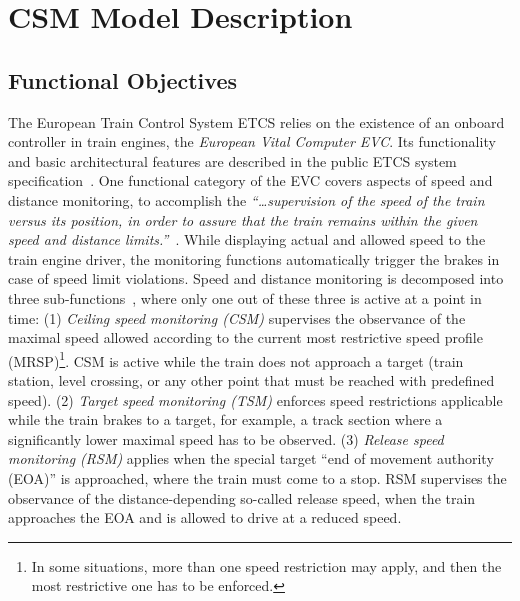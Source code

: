  

\section{CSM Model Description} \label{chap:model}


\subsection{Functional Objectives} \label{sec:ceil}

The European Train Control System ETCS relies on the existence of an
onboard controller in train engines, the \emph{European Vital Computer
  EVC}. Its functionality and basic architectural features are
described in the public ETCS system specification~\cite{ETCS}.  One
functional category of the EVC covers aspects of speed and distance
monitoring, to accomplish the \emph{``\ldots supervision of the speed
  of the train versus its position, in order to assure that the train
  remains within the given speed and distance
  limits.''}~\cite[3.13.1.1]{ETCSSRS-Principles}. While displaying
actual and allowed speed to the train engine driver, the monitoring
functions automatically trigger the brakes in case of speed limit
violations.  Speed and distance monitoring is decomposed into three
sub-functions~\cite[3.13.10.1.2]{ETCSSRS-Principles}, where only one
out of these three is active at a point in time: (1) \emph{Ceiling
  speed monitoring (CSM)} supervises the observance of the maximal
speed allowed according to the current most restrictive speed profile
(MRSP)\footnote{In some situations, more than one speed restriction
  may apply, and then the most restrictive one has to be enforced.}.
CSM is active while the train does not approach a target (train
station, level crossing, or any other point that must be reached with
predefined speed). (2) \emph{Target speed monitoring (TSM)} enforces
speed restrictions applicable while the train brakes to a target, for
example, a track section where a significantly lower maximal speed has
to be observed.  (3) \emph{Release speed monitoring (RSM)} applies
when the special target ``end of movement authority (EOA)'' is
approached, where the train must come to a stop. RSM supervises the
observance of the distance-depending so-called release speed, when the
train approaches the EOA and is allowed to drive at a reduced speed.

